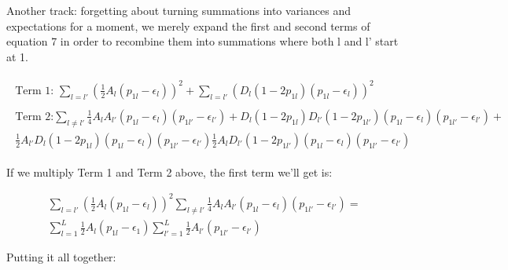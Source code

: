 \documentclass[a4paper,10pt]{article}
\begin{document}
Another track: forgetting about turning summations into variances and
expectations for a moment, we merely expand the first and second terms
of equation 7 in order to recombine them into summations where both l
and l' start at 1. 

\begin{align}
  \begin{split}
 \text{Term 1: } \sum_{l=l'} (\frac{1}{2}A_l(p_{1l}-\epsilon_l))^2 +
  \sum_{l = l'}(D_l(1-2p_{1l})(p_{1l}-\epsilon_l))^2
  \end{split}
  \\
  \begin{split}
\text{Term 2:} \sum_{l \neq l'}
\frac{1}{4}A_lA_{l'}(p_{1l}-\epsilon_{l})(p_{1l'}-\epsilon_{l'})+D_l(1-2p_{1l})D_{l'}(1-2p_{1l'})(p_{1l}-\epsilon_{l})(p_{1l'}-\epsilon_{l'})+\\
\frac{1}{2}A_{l'}D_{l}(1-2p_{1l})(p_{1l}-\epsilon_{l})(p_{1l'}-\epsilon_{l'})\frac{1}{2}A_{l}D_{l'}(1-2p_{1l'})(p_{1l}-\epsilon_{l})(p_{1l'}-\epsilon_{l'})
\end{split}
\end{align}

If we multiply Term 1 and Term 2 above, the first term we'll get is:

\begin{equation}
  \begin{split}
  \sum_{l=l'}( \frac{1}{2}A_l(p_{1l}-\epsilon_{l}))^2
  \sum_{l \neq l'}\frac{1}{4}A_lA_{l'}(p_{1l}-\epsilon_{l})(p_{1l'}-\epsilon_{l'})
  = \\
  \sum^L_{l=1}\frac{1}{2}A_l(p_{1l}-\epsilon_{1}) \sum^L_{l'=1}\frac{1}{2}A_{l'}(p_{1l'}-\epsilon_{l'})
\end{split}
\end{equation}

Putting it all together:
\end{document}
